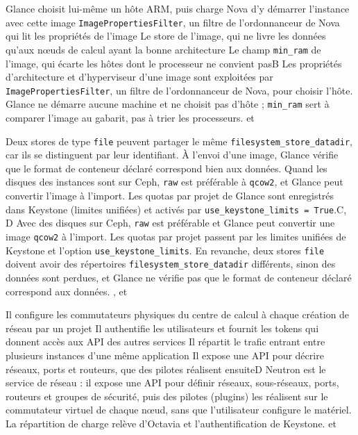   {Glance choisit lui-même un hôte ARM, puis charge Nova d'y démarrer l'instance avec cette image}
  {\texttt{ImagePropertiesFilter}, un filtre de l'ordonnanceur de Nova qui lit les propriétés de l'image}
  {Le store de l'image, qui ne livre les données qu'aux nœuds de calcul ayant la bonne architecture}
  {Le champ \texttt{min\_ram} de l'image, qui écarte les hôtes dont le processeur ne convient pas}{B}
  {Les propriétés d'architecture et d'hyperviseur d'une image sont exploitées par \texttt{ImagePropertiesFilter}, un filtre de l'ordonnanceur de Nova, pour choisir l'hôte. Glance ne démarre aucune machine et ne choisit pas d'hôte ; \texttt{min\_ram} sert à comparer l'image au gabarit, pas à trier les processeurs.}
  { et }

  {Deux stores de type \texttt{file} peuvent partager le même \texttt{filesystem\_store\_datadir}, car ils se distinguent par leur identifiant.}
  {À l'envoi d'une image, Glance vérifie que le format de conteneur déclaré correspond bien aux données.}
  {Quand les disques des instances sont sur Ceph, \texttt{raw} est préférable à \texttt{qcow2}, et Glance peut convertir l'image à l'import.}
  {Les quotas par projet de Glance sont enregistrés dans Keystone (limites unifiées) et activés par \texttt{use\_keystone\_limits = True}.}{C, D}
  {Avec des disques sur Ceph, \texttt{raw} est préférable et Glance peut convertir une image \texttt{qcow2} à l'import. Les quotas par projet passent par les limites unifiées de Keystone et l'option \texttt{use\_keystone\_limits}. En revanche, deux stores \texttt{file} doivent avoir des répertoires \texttt{filesystem\_store\_datadir} différents, sinon des données sont perdues, et Glance ne vérifie pas que le format de conteneur déclaré correspond aux données.}
  {,  et }


  {Il configure les commutateurs physiques du centre de calcul à chaque création de réseau par un projet}
  {Il authentifie les utilisateurs et fournit les tokens qui donnent accès aux API des autres services}
  {Il répartit le trafic entrant entre plusieurs instances d'une même application}
  {Il expose une API pour décrire réseaux, ports et routeurs, que des pilotes réalisent ensuite}{D}
  {Neutron est le service de réseau : il expose une API pour définir réseaux, sous-réseaux, ports, routeurs et groupes de sécurité, puis des pilotes (plugins) les réalisent sur le commutateur virtuel de chaque nœud, sans que l'utilisateur configure le matériel. La répartition de charge relève d'Octavia et l'authentification de Keystone.}
  { et }

